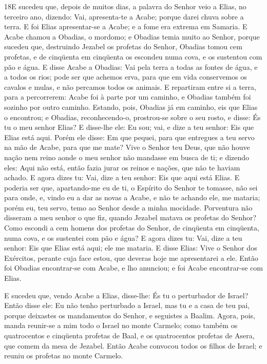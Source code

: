 \medskip

\lettrine{18} E sucedeu que, depois de muitos dias, a palavra
do Senhor veio a Elias, no terceiro ano, dizendo: Vai, apresenta-te
a Acabe; porque darei chuva sobre a terra. E foi Elias
apresentar-se a Acabe; e a fome era extrema em Samaria. E Acabe
chamou a Obadias, o mordomo; e Obadias temia muito ao Senhor,
porque sucedeu que, destruindo Jezabel os profetas do Senhor,
Obadias tomou cem profetas, e de cinqüenta em cinqüenta os escondeu
numa cova, e os sustentou com pão e água. E disse Acabe a
Obadias: Vai pela terra a todas as fontes de água, e a todos os
rios; pode ser que achemos erva, para que em vida conservemos os
cavalos e mulas, e não percamos todos os animais. E repartiram
entre si a terra, para a percorrerem: Acabe foi à parte por um
caminho, e Obadias também foi sozinho por outro caminho.
Estando, pois, Obadias já em caminho, eis que Elias o encontrou;
e Obadias, reconhecendo-o, prostrou-se sobre o seu rosto, e disse:
És tu o meu senhor Elias? E disse-lhe ele: Eu sou; vai, e dize a
teu senhor: Eis que Elias está aqui. Porém ele disse: Em que
pequei, para que entregues a teu servo na mão de Acabe, para que me
mate? Vive o Senhor teu Deus, que não houve nação nem reino
aonde o meu senhor não mandasse em busca de ti; e dizendo eles: Aqui
não está, então fazia jurar os reinos e nações, que não te haviam
achado. E agora dizes tu: Vai, dize a teu senhor: Eis que
aqui está Elias. E poderia ser que, apartando-me eu de ti, o
Espírito do Senhor te tomasse, não sei para onde, e, vindo eu a dar
as novas a Acabe, e não te achando ele, me mataria; porém eu, teu
servo, temo ao Senhor desde a minha mocidade. Porventura não
disseram a meu senhor o que fiz, quando Jezabel matava os profetas
do Senhor? Como escondi a cem homens dos profetas do Senhor, de
cinqüenta em cinqüenta, numa cova, e os sustentei com pão e água?
E agora dizes tu: Vai, dize a teu senhor: Eis que Elias está
aqui; ele me mataria. E disse Elias: Vive o Senhor dos
Exércitos, perante cuja face estou, que deveras hoje me apresentarei
a ele. Então foi Obadias encontrar-se com Acabe, e lho
anunciou; e foi Acabe encontrar-se com Elias.

E sucedeu que, vendo Acabe a Elias, disse-lhe: És tu o
perturbador de Israel? Então disse ele: Eu não tenho
perturbado a Israel, mas tu e a casa de teu pai, porque deixastes os
mandamentos do Senhor, e seguistes a Baalim. Agora, pois,
manda reunir-se a mim todo o Israel no monte Carmelo; como também os
quatrocentos e cinqüenta profetas de Baal, e os quatrocentos
profetas de Asera, que comem da mesa de Jezabel. Então Acabe
convocou todos os filhos de Israel; e reuniu os profetas no monte
Carmelo.

